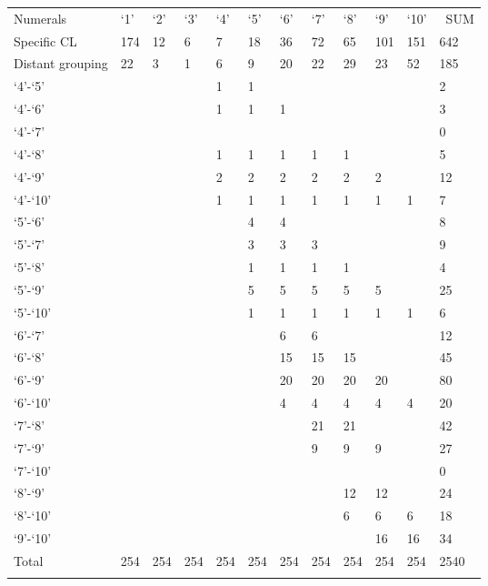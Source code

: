 \begin{table}
  
\begin{tabularx}{\textwidth}{lXXXXXXXXXXX}
\lsptoprule
{Numerals} & {‘1}{’} & {‘2}{’} & {‘3}{’} & {‘4}{’} & {‘5}{’} & {‘6}{’} & {‘7}{’} & {‘8}{’} & {‘9}{’} & {‘10}{’} & {~SUM}\\
Specific CL & 174 & 12 & 6 & 7 & 18 & 36 & 72 & 65 & 101 & 151 & 642\\
Distant grouping & 22 & 3 & 1 & 6 & 9 & 20 & 22 & 29 & 23 & 52 & 185\\
\midrule
‘4’-‘5’ & & ~ & & 1 & 1 & & ~ & & ~ & & 2\\
‘4’-‘6’ & & ~ & & 1 & 1 & 1 & & ~ & & ~ & 3\\
‘4’-‘7’ & & ~ & & ~ & & ~ & & ~ & & ~ & 0\\
‘4’-‘8’ & & ~ & & 1 & 1 & 1 & 1 & 1 & & ~ & 5\\
‘4’-‘9’ & & ~ & & 2 & 2 & 2 & 2 & 2 & 2 & & 12\\
‘4’-‘10’ & & ~ & & 1 & 1 & 1 & 1 & 1 & 1 & 1 & 7\\
‘5’-‘6’ & & ~ & & ~ & 4 & 4 & & ~ & & ~ & 8\\
‘5’-‘7’ & & ~ & & ~ & 3 & 3 & 3 & & ~ & & 9\\
‘5’-‘8’ & & ~ & & ~ & 1 & 1 & 1 & 1 & & ~ & 4\\
‘5’-‘9’ & & ~ & & ~ & 5 & 5 & 5 & 5 & 5 & & 25\\
‘5’-‘10’ & & ~ & & ~ & 1 & 1 & 1 & 1 & 1 & 1 & 6\\
‘6’-‘7’ & & ~ & & ~ & & 6 & 6 & & ~ & & 12\\
‘6’-‘8’ & & ~ & & ~ & & 15 & 15 & 15 & & ~ & 45\\
‘6’-‘9’ & & ~ & & ~ & & 20 & 20 & 20 & 20 & & 80\\
‘6’-‘10’ & & ~ & & ~ & & 4 & 4 & 4 & 4 & 4 & 20\\
‘7’-‘8’ & & ~ & & ~ & & ~ & 21 & 21 & & ~ & 42\\
‘7’-‘9’ & & ~ & & ~ & & ~ & 9 & 9 & 9 & & 27\\
‘7’-‘10’ & & ~ & & ~ & & ~ & & ~ & & ~ & 0\\
‘8’-‘9’ & & ~ & & ~ & & ~ & & 12 & 12 & & 24\\
‘8’-‘10’ & & ~ & & ~ & & ~ & & 6 & 6 & 6 & 18\\
‘9’-‘10’ & & ~ & & ~ & & ~ & & ~ & 16 & 16 & 34\\
\midrule
Total & 254 & 254 & 254 & 254 & 254 & 254 & 254 & 254 & 254 & 254 & 2540\\
\lspbottomrule
\end{tabularx}
\end{table}


